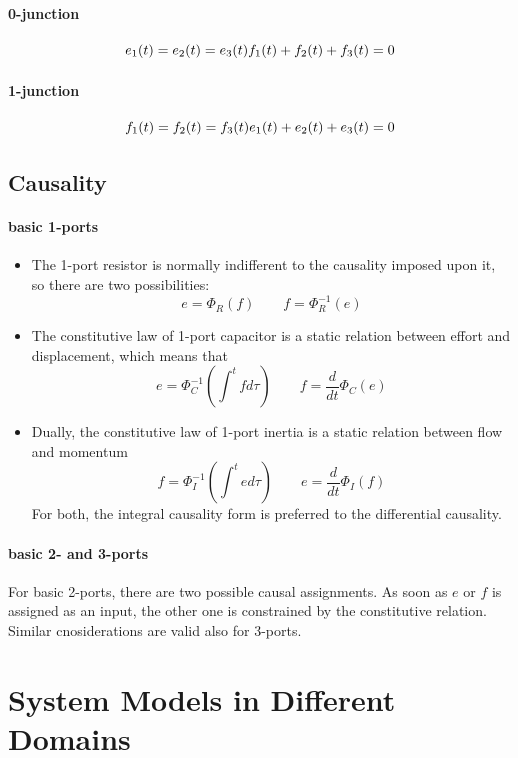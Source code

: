 \documentclass{book}
\begin{document}
\subsubsection{0-junction}
\[
    e_1(t)=e_2(t)=e_3(t)\\
    f_1(t)+f_2(t)+f_3(t)=0
\]
\subsubsection{1-junction}
\[
    f_1(t)=f_2(t)=f_3(t)\\
    e_1(t)+e_2(t)+e_3(t)=0
\]

\section{Causality}
\subsubsection{basic 1-ports}
\begin{itemize}
    \item The 1-port resistor is normally indifferent to the causality imposed upon it, so there are two possibilities: 
        \[
            e = \Phi_R(f) \qquad f = \Phi_R^{-1}(e)
        \]
    \item The constitutive law of 1-port capacitor is a static relation between effort and displacement, which means that 
        \[
            e = \Phi_C^{-1}(\int_{}^{t}fd\tau) \qquad f = \displaystyle\frac{d}{dt}\Phi_C(e)
        \]
    \item Dually, the constitutive law of 1-port inertia is a static relation between flow and momentum
        \[
            f = \Phi_I^{-1}(\int_{}^{t}ed\tau) \qquad e = \displaystyle\frac{d}{dt}\Phi_I(f)
        \]
        For both, the integral causality form is preferred to the differential causality.
\end{itemize}
\subsubsection{basic 2- and 3-ports}
For basic 2-ports, there are two possible causal assignments. As soon as $e$ or $f$ is assigned as an input, the other one is constrained by the constitutive relation. Similar cnosiderations are valid also for 3-ports.

\chapter{System Models in Different Domains}
\end{document}
